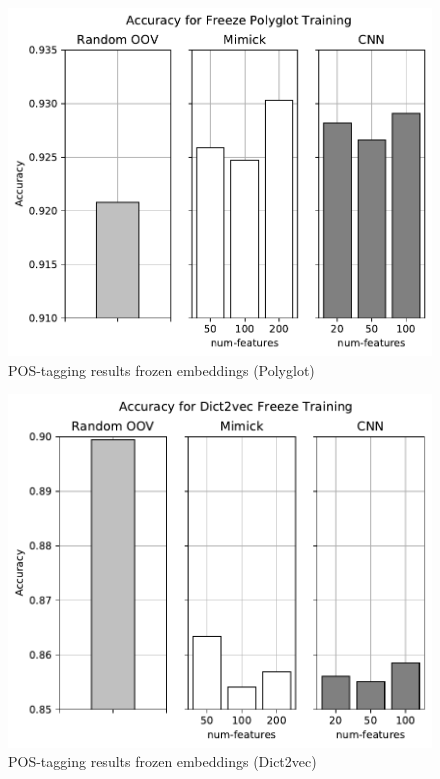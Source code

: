       \begin{figure}[H]
        \centering
        \includegraphics[width=0.8\linewidth]{images/freeze_polyglot.pdf}
        \caption{POS-tagging results frozen embeddings (Polyglot)}
        \label{fig:postag_polyglot_freeze_results}
      \end{figure}
      \begin{figure}[H]
        \centering
        \includegraphics[width=0.8\linewidth]{images/freeze_dict2vec.pdf}
        \caption{POS-tagging results frozen embeddings (Dict2vec)}
        \label{fig:postag_dict2vec_freeze_results}
      \end{figure}
      
